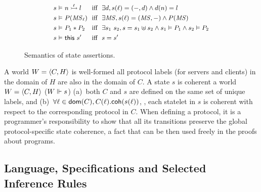 {
\setlength{\belowcaptionskip}{-10pt}
\begin{figure}
\centering
{\begin{varwidth}{\dimexpr{}\fboxrule\relax}
\[
{\small{
\begin{array}{r@{\ }c@{\ }l@{\ \ }c@{\ \ }l}
  s & \vDash & n \ppts{\lab} l & \text{iff} &
                                                     \exists d, s(\lab) = (-, d) \aand  d(n) = l \\[3pt]
  s & \vDash & P(\MS_{\lab}) & \text{iff} & \exists \MS, s(\lab) = (\MS, -) \aand
                                                   P(\MS) \\[3pt]
  s & \vDash & P_1 \psep P_2 & \text{iff} &
                                            \exists s_1~s_2,  s = s_1 \join s_2 \aand  s_1 \vDash P_1 \aand
                                            s_2 \vDash P_2
  \\[3pt]
  s & \vDash & \This{s'} & \text{iff} & s = s'
\end{array}
}}
\]
\end{varwidth}}
\caption{Semantics of \disel state assertions.}
\label{fig:dsem}
\end{figure}
}

A world $W = \langle{C, H}\rangle$ is well-formed \Iff all
protocol labels (for servers and clients) in the domain of $H$ are
also in the domain of $C$.
%
A state $s$ is coherent \wrt a world $W = \langle{C, H}\rangle$
(${W} \Vdash {s}$) \Iff (a)~both $C$ and $s$ are defined on the same set
of unique labels, and
(b)~$\forall \ell \in \mathsf{dom}(C), C(\ell).\mathsf{coh}(s(\ell))$, \ie, each
statelet in $s$ is coherent with respect to the corresponding protocol
in $C$.
%
When defining a protocol, it is a programmer's responsibility to show
that all its transitions preserve the global protocol-specific state
coherence, a fact that can be then used freely in the proofs about
programs.

\subsection{Language, Specifications and Selected Inference Rules}
\label{sec:stat-mess-soups}



